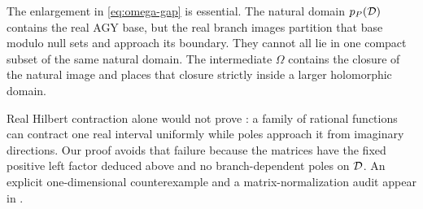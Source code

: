 The enlargement in \eqref{eq:omega-gap} is essential.  The natural domain
\(p_P(\mathcal{D})\) contains the real AGY base, but the real branch images partition
that base modulo null sets and approach its boundary.  They cannot all lie
in one compact subset of the same natural domain.  The intermediate
\(\Omega\) contains the closure of the natural image and places that closure
strictly inside a larger holomorphic domain.

Real Hilbert contraction alone would not prove
: a family of rational functions can contract one
real interval uniformly while poles approach it from imaginary directions.
Our proof avoids that failure because the matrices have the fixed positive
left factor deduced above and no branch-dependent poles on \(\mathcal{D}\).  An explicit
one-dimensional counterexample and a matrix-normalization audit appear in
.
